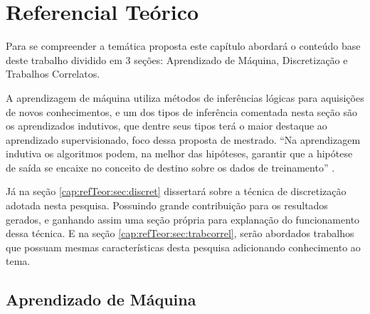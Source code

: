 \chapter{Referencial Teórico}\label{cap:refTeor}


Para se compreender  a temática proposta  este capítulo abordará o conteúdo base deste trabalho dividido em 3 seções: Aprendizado de Máquina, Discretização e Trabalhos Correlatos. 

A aprendizagem de máquina utiliza métodos de inferências lógicas para aquisições de novos conhecimentos, e um dos tipos de inferência comentada nesta seção são os aprendizados indutivos, que dentre seus tipos terá o maior destaque  ao aprendizado supervisionado, foco dessa proposta de mestrado. ``Na aprendizagem indutiva os algoritmos podem, na melhor das hipóteses, garantir que a hipótese de saída se encaixe no conceito de destino sobre os dados de treinamento'' \cite[p.23]{Mitchell1997}.




Já na seção \ref{cap:refTeor:sec:discret} dissertará sobre a técnica de discretização adotada nesta pesquisa. Possuindo grande contribuição para os resultados gerados, e ganhando assim uma seção própria para explanação do funcionamento dessa técnica. E na seção \ref{cap:refTeor:sec:trabcorrel}, serão abordados trabalhos que possuam mesmas características desta pesquisa adicionando conhecimento ao tema.



\section{Aprendizado de Máquina}\label{cap:refTeor:sec:aprendMaq}

